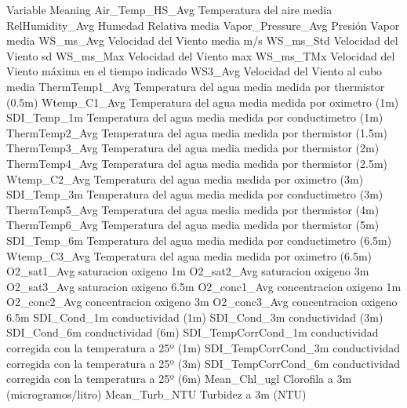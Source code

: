 Variable	Meaning
Air_Temp_HS_Avg	 Temperatura del aire media
RelHumidity_Avg	 Humedad Relativa media
Vapor_Pressure_Avg	 Presión Vapor media
WS_ms_Avg	 Velocidad del Viento media m/s
WS_ms_Std	 Velocidad del Viento sd
WS_ms_Max	 Velocidad del Viento max
WS_ms_TMx	 Velocidad del Viento máxima en el tiempo indicado
WS3_Avg	 Velocidad del Viento al cubo media
ThermTemp1_Avg	Temperatura del agua media medida por thermistor (0.5m)
Wtemp_C1_Avg	Temperatura del agua media medida por oximetro (1m)
SDI_Temp_1m	Temperatura del agua media medida por conductimetro (1m)
ThermTemp2_Avg	Temperatura del agua media medida por thermistor (1.5m)
ThermTemp3_Avg	Temperatura del agua media medida por thermistor (2m)
ThermTemp4_Avg	Temperatura del agua media medida por thermistor (2.5m)
Wtemp_C2_Avg	Temperatura del agua media medida por oximetro (3m)
SDI_Temp_3m	Temperatura del agua media medida por conductimetro (3m)
ThermTemp5_Avg	Temperatura del agua media medida por thermistor (4m)
ThermTemp6_Avg	Temperatura del agua media medida por thermistor (5m)
SDI_Temp_6m	Temperatura del agua media medida por conductimetro (6.5m)
Wtemp_C3_Avg	Temperatura del agua media medida por oximetro (6.5m)
O2_sat1_Avg	saturacion oxigeno 1m
O2_sat2_Avg	saturacion oxigeno 3m
O2_sat3_Avg	saturacion oxigeno 6.5m
O2_conc1_Avg	concentracion oxigeno 1m
O2_conc2_Avg	concentracion oxigeno 3m
O2_conc3_Avg	concentracion oxigeno 6.5m
SDI_Cond_1m	conductividad (1m)
SDI_Cond_3m	conductividad (3m)
SDI_Cond_6m	conductividad (6m)
SDI_TempCorrCond_1m	conductividad corregida con la temperatura a 25º (1m)
SDI_TempCorrCond_3m	conductividad corregida con la temperatura a 25º (3m)
SDI_TempCorrCond_6m	conductividad corregida con la temperatura a 25º (6m)
Mean_Chl_ugl	Clorofila a 3m (microgramos/litro)
Mean_Turb_NTU	Turbidez a 3m (NTU)